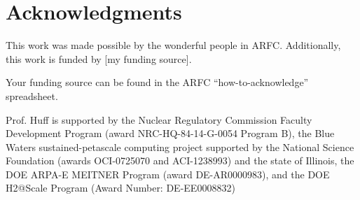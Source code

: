 \section{Acknowledgments}

This work was made possible by the wonderful people in ARFC. Additionally,
this work is funded by [my funding source].

Your funding source can be found in the ARFC ``how-to-acknowledge'' spreadsheet.

Prof. Huff is supported by the Nuclear Regulatory Commission Faculty
Development Program (award NRC-HQ-84-14-G-0054 Program B), the Blue Waters
sustained-petascale computing project supported by the National Science
Foundation (awards OCI-0725070 and ACI-1238993) and the state of Illinois, the
DOE ARPA-E MEITNER Program (award DE-AR0000983), and the DOE H2@Scale Program
(Award Number: DE-EE0008832)
